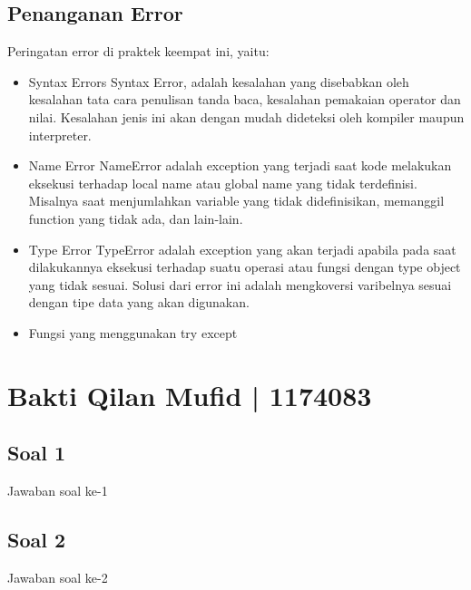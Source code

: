 \subsection{Penanganan Error}
Peringatan error di praktek keempat ini, yaitu:
	\begin{itemize}
		\item Syntax Errors
		Syntax Error, adalah kesalahan yang disebabkan oleh kesalahan tata cara penulisan tanda baca, kesalahan pemakaian operator dan nilai. Kesalahan jenis ini akan dengan mudah dideteksi oleh kompiler maupun interpreter.

		\item Name Error
		NameError adalah exception yang terjadi saat kode melakukan eksekusi terhadap local name atau global name yang tidak terdefinisi. Misalnya saat menjumlahkan variable yang tidak didefinisikan, memanggil function yang tidak ada, dan lain-lain.

		\item Type Error
		TypeError adalah exception yang akan terjadi apabila pada saat dilakukannya eksekusi terhadap suatu operasi atau fungsi dengan type object yang tidak sesuai. Solusi dari error ini adalah mengkoversi varibelnya sesuai dengan tipe data yang akan digunakan.
	

	\item Fungsi yang menggunakan try except
	
\end{itemize}


\section{Bakti Qilan Mufid | 1174083}
\subsection{Soal 1}
Jawaban soal ke-1



\subsection{Soal 2}
Jawaban soal ke-2



